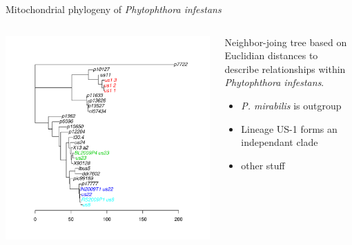 \documentclass[final,t]{beamer}
\begin{document}
\begin{frame}{}
\begin{columns}[t]
\begin{column}{.4\linewidth}
      \begin{block}{Mitochondrial phylogeny of \emph{Phytophthora infestans}}
        \begin{columns}[t]
          \begin{column}[T]{0.6\linewidth}
            \includegraphics[width=0.9\linewidth, height=0.5\linewidth]{chromR7.pdf}
          \end{column}
          \begin{column}[T]{0.4\linewidth}
            Neighbor-joing tree based on Euclidian distances to describe relationships within \emph{Phytophthora infestans}.
            \begin{itemize}
              \item \emph{P. mirabilis} is outgroup
              \item Lineage US-1 forms an independant clade
              \item other stuff
            \end{itemize}
          \end{column}
        \end{columns}
      \end{block}


\end{column}
\end{columns}
\end{frame}
\end{document}
